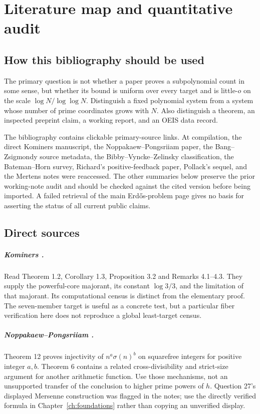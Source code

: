 \chapter{Literature map and quantitative audit}\label{ch:literature}
\section{How this bibliography should be used}
The primary question is not whether a paper proves a subpolynomial count in
some sense, but whether its bound is uniform over every target and is
little-$o$ on the scale $\log N/\log\log N$. Distinguish a fixed polynomial
system from a system whose number of prime coordinates grows with $N$.
Also distinguish a theorem, an inspected preprint claim, a working report,
and an OEIS data record.

The bibliography contains clickable primary-source links. At compilation,
the direct Kominers manuscript, the Noppakaew--Pongsriiam paper, the
Bang--Zsigmondy source metadata, the Bibby--Vyncke--Zelinsky classification,
the Bateman--Horn survey, Richard's positive-feedback paper, Pollack's sequel,
and the Mertens notes were reaccessed. The other summaries below preserve the
prior working-note audit and should be checked against the cited version before
being imported. A failed retrieval of the main Erd\H{o}s-problem page gives no
basis for asserting the status of all current public claims.

\section{Direct sources}
\paragraph{Kominers \cite{kominers}.}
Read Theorem 1.2, Corollary 1.3, Proposition 3.2 and Remarks 4.1--4.3.
They supply the powerful-core majorant, its constant $\log3/3$, and the limitation
of that majorant. Its computational census is distinct from the elementary
proof. The seven-member target is useful as a concrete test, but a particular
fiber verification here does not reproduce a global least-target census.

\paragraph{Noppakaew--Pongsriiam \cite{np}.}
Theorem 12 proves injectivity of $n^a\sigma(n)^b$ on squarefree integers for
positive integer $a,b$. Theorem 6 contains a related cross-divisibility and
strict-size argument for another arithmetic function. Use those mechanisms,
not an unsupported transfer of the conclusion to higher prime powers of $h$.
Question 27's displayed Mersenne construction was flagged in the notes; use the
directly verified formula in Chapter~\ref{ch:foundations} rather than copying
an unverified display.

